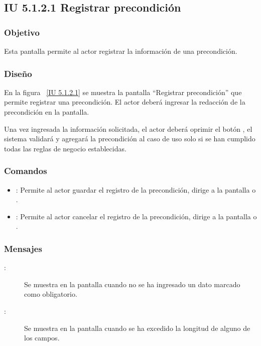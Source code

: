 \subsection{IU 5.1.2.1 Registrar precondición}

\subsubsection{Objetivo}
	
	Esta pantalla permite al actor registrar la información de una precondición.

\subsubsection{Diseño}

    En la figura ~\ref{IU 5.1.2.1} se muestra la pantalla ``Registrar precondición'' que permite registrar una precondición. El actor deberá ingresar la redacción de la precondición en la pantalla.
    
    Una vez ingresada la información solicitada, el actor deberá oprimir el botón , el sistema validará y agregará la precondición al caso de uso
    solo si se han cumplido todas las reglas de negocio establecidas.  \\



\subsubsection{Comandos}
\begin{itemize}
	\item {}: Permite al actor guardar el registro de la precondición, dirige a la pantalla  o .
	\item {}: Permite al actor cancelar el registro de la precondición, dirige a la pantalla  o .
\end{itemize}

\subsubsection{Mensajes}

	
\begin{description}
	\item[ :] Se muestra en la pantalla  cuando no se ha ingresado un dato marcado como obligatorio.
	\item[ :] Se muestra en la pantalla  cuando se ha excedido la longitud de alguno de los campos.
\end{description}
